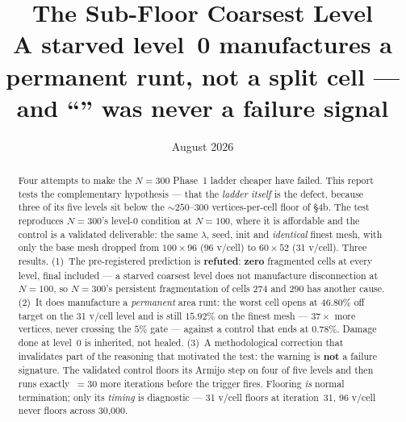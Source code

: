 \documentclass[11pt,a4paper]{article}
\title{\textbf{The Sub-Floor Coarsest Level}\\[0.5em]
  \large A starved level~0 manufactures a permanent runt, not a split cell ---
  and ``\code{LINE SEARCH STALLED}'' was never a failure signal}
\author{}
\date{August 2026}
\begin{document}
\maketitle

\begin{abstract}
Four attempts to make the \(N{=}300\) Phase~1 ladder cheaper have failed. This
report tests the complementary hypothesis --- that the \emph{ladder itself} is
the defect, because three of its five levels sit below the
\(\sim\!250\text{--}300\) vertices-per-cell floor of
 \S4b. The test
reproduces \(N{=}300\)'s level-0 condition at \(N{=}100\), where it is
affordable and the control is a validated deliverable: the same \(\lambda\),
seed, init and \emph{identical} finest mesh, with only the base mesh dropped
from \(100{\times}96\) (96 v/cell) to \(60{\times}52\) (31 v/cell). Three
results. (1)~The pre-registered prediction is \textbf{refuted}: \textbf{zero}
fragmented cells at every level, final included --- a starved coarsest level does
not manufacture disconnection at \(N{=}100\), so \(N{=}300\)'s persistent
fragmentation of cells 274 and 290 has another cause. (2)~It does manufacture a
\emph{permanent} area runt: the worst cell opens at \(46.80\%\) off target on the
31 v/cell level and is still \(\mathbf{15.92\%}\) on the finest mesh --- \(37\times\)
more vertices, never crossing the \(5\%\) gate --- against a control that ends at
\(0.78\%\). Damage done at level~0 is inherited, not healed. (3)~A methodological
correction that invalidates part of the reasoning that motivated the test: the
 warning is \textbf{not} a failure signature. The
validated control floors its Armijo step on four of five levels and then runs
exactly \,\(=30\) more iterations before the trigger
fires. Flooring \emph{is} normal termination; only its \emph{timing} is
diagnostic --- 31 v/cell floors at iteration~31, 96 v/cell never floors across
30{,}000.
\end{abstract}
\end{document}
